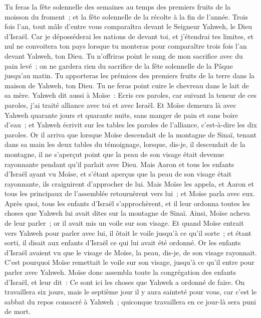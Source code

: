 \begin{multicols}{2}
Tu feras la fête solennelle des semaines au temps des premiers fruits de la moisson du froment~; et la fête solennelle de la récolte à la fin de l'année.
Trois fois l'an, tout mâle d'entre vous comparaîtra devant le Seigneur Yahweh, le Dieu d'Israël.
Car je déposséderai les nations de devant toi, et j'étendrai tes limites, et nul ne convoitera ton pays lorsque tu monteras pour comparaître trois fois l'an devant Yahweh, ton Dieu.
Tu n'offriras point le sang de mon sacrifice avec du pain levé~; on ne gardera rien du sacrifice de la fête solennelle de la Pâque jusqu'au matin.
Tu apporteras les prémices des premiers fruits de la terre dans la maison de Yahweh, ton Dieu. Tu ne feras point cuire le chevreau dans le lait de sa mère.
Yahweh dit aussi à Moïse~: Ecris ces paroles, car suivant la teneur de ces paroles, j'ai traité alliance avec toi et avec Israël.
Et Moïse demeura là avec Yahweh quarante jours et quarante nuits, sans manger de pain et sans boire d'eau~; et Yahweh écrivit sur les tables les paroles de l'alliance, c'est-à-dire les dix paroles.
Or il arriva que lorsque Moïse descendait de la montagne de Sinaï, tenant dans sa main les deux tables du témoignage, lorsque, dis-je, il descendait de la montagne, il ne s'aperçut point que la peau de son visage était devenue rayonnante pendant qu'il parlait avec Dieu.
Mais Aaron et tous les enfants d'Israël ayant vu Moïse, et s'étant aperçus que la peau de son visage était rayonnante, ils craignirent d'approcher de lui.
Mais Moïse les appela, et Aaron et tous les principaux de l'assemblée retournèrent vers lui~; et Moïse parla avec eux.
Après quoi, tous les enfants d'Israël s'approchèrent, et il leur ordonna toutes les choses que Yahweh lui avait dites sur la montagne de Sinaï.
Ainsi, Moïse acheva de leur parler~; or il avait mis un voile sur son visage.
Et quand Moïse entrait vers Yahweh pour parler avec lui, il ôtait le voile jusqu'à ce qu'il sorte~; et étant sorti, il disait aux enfants d'Israël ce qui lui avait été ordonné.
Or les enfants d'Israël avaient vu que le visage de Moïse, la peau, dis-je, de son visage rayonnait. C'est pourquoi Moïse remettait le voile sur son visage, jusqu'à ce qu'il entre pour parler avec Yahweh.
\VerseOne{}Moïse donc assembla toute la congrégation des enfants d'Israël, et leur dit~: Ce sont ici les choses que Yahweh a ordonné de faire.
On travaillera six jours, mais le septième jour il y aura sainteté pour vous, car c'est le sabbat du repos consacré à Yahweh~; quiconque travaillera en ce jour-là sera puni de mort.

\end{multicols}
